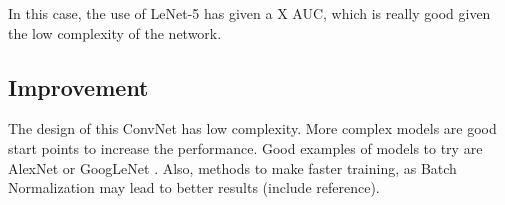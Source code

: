 \documentclass[]{article}
\begin{document}
In this case, the use of LeNet-5 has given a X AUC, which is really good given the low complexity of the network.
\subsection{Improvement}\label{improvement}

The design of this ConvNet has low complexity. More complex models are good start points to increase the performance. Good examples of models to try are AlexNet \cite{Krizhevsky12} or GoogLeNet \cite{Szegedy16}. Also, methods to make faster training, as Batch Normalization may lead to better results (include reference).

\end{document}

